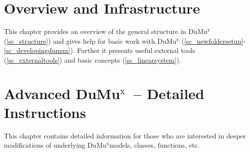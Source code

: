 \documentclass[11pt,a4paper,headinclude,footinclude,DIV16]{scrreprt}
\newcommand{\Dumux}{\texorpdfstring{Du\-Mu$^\text{x}$\xspace}{DuMuX\xspace}}
\begin{document}
\chapter{Overview and Infrastructure}
This chapter provides an overview of the general structure in \Dumux (\ref{sc_structure})
and gives help for basic work with \Dumux
(\ref{sc_newfoldersetup}-\ref{sc_developingdumux}).
Further it presents useful external tools (\ref{sc_externaltools}) and basic
concepts (\ref{sc_linearsystem}).








\chapter{Advanced \Dumux\ -- Detailed Instructions}
This chapter contains detailed information for those who are interested
in deeper modifications of underlying \Dumux models, classes, functions, etc.










\end{document}
